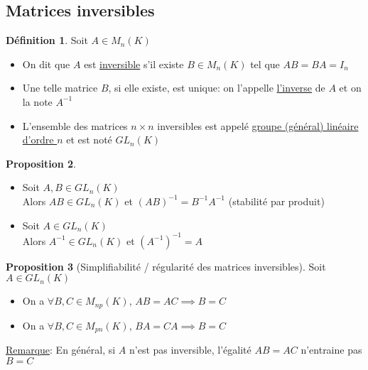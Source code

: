 \documentclass[10pt,a4paper]{article}
\theoremstyle{definition}
\newtheorem{proposition}{Proposition}[section]
\newtheorem{definition}[proposition]{Définition}
\begin{document}
\subsection{Matrices inversibles}
\begin{definition}
Soit $A \in M_n(K)$
\begin{itemize}
\item On dit que $A$ est \uline{inversible} s'il existe $B \in M_n(K)$ tel que $AB = BA = I_n$
\item Une telle matrice $B$, si elle existe, est unique: on l'appelle \uline{l'inverse} de $A$ et on la note $A^{-1}$
\item L'ensemble des matrices $n \times n$ inversibles est appelé \uline{groupe (général) linéaire d'ordre $n$} et est noté $GL_n(K)$
\end{itemize}
\end{definition}
\begin{proposition}
\hfill
\begin{itemize}
\item Soit $A, B \in GL_n(K)$ \\
Alors $AB \in GL_n(K)$ et $(AB)^{-1} = B^{-1} A^{-1}$ (stabilité par produit)
\item Soit $A \in GL_n(K)$ \\
Alors $A^{-1} \in GL_n(K)$ et $\left(A^{-1}\right)^{-1} = A$
\end{itemize}
\end{proposition}
\begin{proposition}[Simplifiabilité / régularité des matrices inversibles]
Soit $A \in GL_n(K)$
\begin{itemize}
\item On a $\forall B, C \in M_{np}(K)$, $AB = AC \implies B = C$
\item On a $\forall B, C \in M_{pn}(K)$, $BA = CA \implies B = C$
\end{itemize}
\end{proposition}
\noindent \uline{Remarque}: En général, si $A$ n'est pas inversible, l'égalité $AB = AC$ n'entraine pas $B = C$
\end{document}
